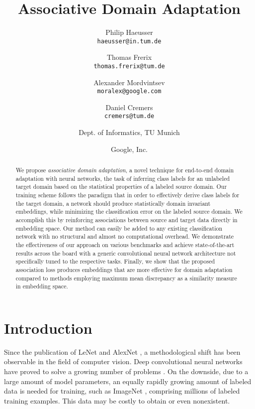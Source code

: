 \documentclass[10pt,twocolumn,letterpaper]{article}
\begin{document}
\title{Associative Domain Adaptation}

\author{Philip Haeusser\\
{\tt\small haeusser@in.tum.de}
\and
Thomas Frerix\\
{\tt\small thomas.frerix@tum.de}
\and
Alexander Mordvintsev\\
{\tt\small moralex@google.com}
\and
Daniel Cremers\\
{\tt\small cremers@tum.de}
\and
Dept. of Informatics, TU Munich\\
\and
Google, Inc.
}

\maketitle



\begin{abstract}
We propose \emph{associative domain adaptation}, a novel technique for end-to-end domain adaptation with neural networks, the task of inferring class labels for an unlabeled target domain based on the statistical properties of a labeled source domain.
Our training scheme follows the paradigm that in order to effectively derive class labels for the target domain, a network should produce statistically domain invariant embeddings, while minimizing the classification error on the labeled source domain. 
We accomplish this by reinforcing \textnormal{associations} between source and target data directly in embedding space. 
Our method can easily be added to any existing classification network with no structural and almost no computational overhead. 
We demonstrate the effectiveness of our approach on various benchmarks and achieve state-of-the-art results across the board with a generic convolutional neural network architecture not specifically tuned to the respective tasks. Finally, we show that the proposed association loss produces embeddings that are more effective for domain adaptation compared to methods employing maximum mean discrepancy as a similarity measure in embedding space.  
\end{abstract}



\vspace{-\baselineskip}  \section{Introduction} \label{sec:introduction}
Since the publication of LeNet \cite{LeCun1998} and AlexNet \cite{Krizhevsky2012}, a methodological shift has been observable in the field of computer vision. Deep convolutional neural networks have proved to solve a growing number of problems \cite{szegedy2013deep, Eigen-et-al-14, toshev2014deeppose, szegedy2015going, dosovitskiy2015flownet, mayer2016large}. On the downside, due to a large amount of model parameters, an equally rapidly growing amount of labeled data is needed for training, such as ImageNet \cite{Russakovsky2015}, comprising millions of labeled training examples. This data may be costly to obtain or even nonexistent.
\end{document}
